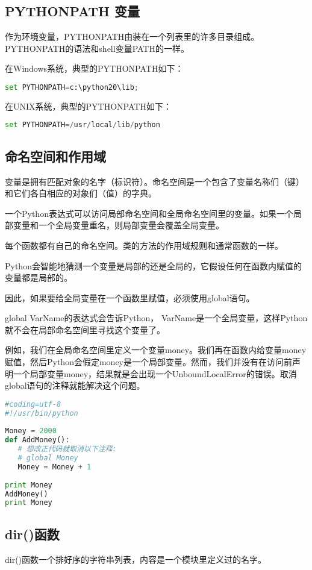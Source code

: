 \subsection{PYTHONPATH 变量}
作为环境变量，PYTHONPATH由装在一个列表里的许多目录组成。PYTHONPATH的语法和shell变量PATH的一样。

在Windows系统，典型的PYTHONPATH如下：
\begin{lstlisting}[language=Python]
set PYTHONPATH=c:\python20\lib;
\end{lstlisting}

在UNIX系统，典型的PYTHONPATH如下：
\begin{lstlisting}[language=Python]
set PYTHONPATH=/usr/local/lib/python
\end{lstlisting}



\subsection{命名空间和作用域}
变量是拥有匹配对象的名字（标识符）。命名空间是一个包含了变量名称们（键）和它们各自相应的对象们（值）的字典。

一个Python表达式可以访问局部命名空间和全局命名空间里的变量。如果一个局部变量和一个全局变量重名，则局部变量会覆盖全局变量。

每个函数都有自己的命名空间。类的方法的作用域规则和通常函数的一样。

Python会智能地猜测一个变量是局部的还是全局的，它假设任何在函数内赋值的变量都是局部的。

因此，如果要给全局变量在一个函数里赋值，必须使用global语句。

global VarName的表达式会告诉Python， VarName是一个全局变量，这样Python就不会在局部命名空间里寻找这个变量了。

例如，我们在全局命名空间里定义一个变量money。我们再在函数内给变量money赋值，然后Python会假定money是一个局部变量。然而，我们并没有在访问前声明一个局部变量money，结果就是会出现一个UnboundLocalError的错误。取消global语句的注释就能解决这个问题。
\begin{lstlisting}[language=Python]
#coding=utf-8
#!/usr/bin/python
 
Money = 2000
def AddMoney():
   # 想改正代码就取消以下注释:
   # global Money
   Money = Money + 1
 
print Money
AddMoney()
print Money
\end{lstlisting}



\subsection{dir()函数}
dir()函数一个排好序的字符串列表，内容是一个模块里定义过的名字。

